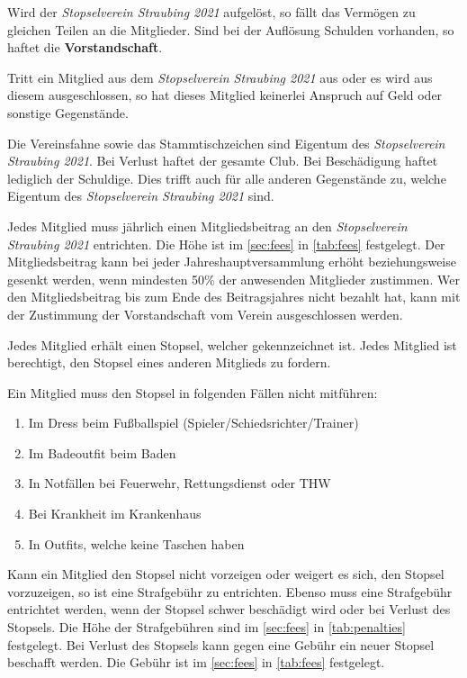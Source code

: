 \documentclass[a4paper,12pt]{scrartcl}
\newcommand{\vereinsName}{Stopselverein Straubing 2021}
\begin{document}
    Wird der \emph{\vereinsName} aufgelöst, so fällt das Vermögen zu gleichen Teilen an die Mitglieder.
    Sind bei der Auflösung Schulden vorhanden, so haftet die \textbf{Vorstandschaft}.

    Tritt ein Mitglied aus dem \emph{\vereinsName} aus oder es wird aus diesem ausgeschlossen,
    so hat dieses Mitglied keinerlei Anspruch auf Geld oder sonstige Gegenstände.

    Die Vereinsfahne sowie das Stammtischzeichen sind Eigentum des \emph{\vereinsName}.
    Bei Verlust haftet der gesamte Club.
    Bei Beschädigung haftet lediglich der Schuldige.
    Dies trifft auch für alle anderen Gegenstände zu, welche Eigentum des \emph{\vereinsName} sind.

    Jedes Mitglied muss jährlich einen Mitgliedsbeitrag an den \emph{\vereinsName} entrichten.
    Die Höhe ist im \autoref{sec:fees} in \autoref{tab:fees} festgelegt.
    Der Mitgliedsbeitrag kann bei jeder Jahreshauptversammlung erhöht beziehungsweise gesenkt werden,
    wenn mindesten 50\% der anwesenden Mitglieder zustimmen.
    Wer den Mitgliedsbeitrag bis zum Ende des Beitragsjahres nicht bezahlt hat,
    kann mit der Zustimmung der Vorstandschaft vom Verein ausgeschlossen werden.

    Jedes Mitglied erhält einen Stopsel, welcher gekennzeichnet ist.
    Jedes Mitglied ist berechtigt, den Stopsel eines anderen Mitglieds zu fordern.

    Ein Mitglied muss den Stopsel in folgenden Fällen nicht mitführen:
    \begin{enumerate}
        \item Im Dress beim Fußballspiel (Spieler/Schiedsrichter/Trainer)
        \item Im Badeoutfit beim Baden
        \item In Notfällen bei Feuerwehr, Rettungsdienst oder THW
        \item Bei Krankheit im Krankenhaus
        \item In Outfits, welche keine Taschen haben
    \end{enumerate}

    Kann ein Mitglied den Stopsel nicht vorzeigen oder weigert es sich,
    den Stopsel vorzuzeigen, so ist eine Strafgebühr zu entrichten.
    Ebenso muss eine Strafgebühr entrichtet werden, wenn der Stopsel schwer beschädigt wird
    oder bei Verlust des Stopsels.
    Die Höhe der Strafgebühren sind im \autoref{sec:fees} in \autoref{tab:penalties} festgelegt.
    Bei Verlust des Stopsels kann gegen eine Gebühr ein neuer Stopsel beschafft werden.
    Die Gebühr ist im \autoref{sec:fees} in \autoref{tab:fees} festgelegt.
\end{document}
